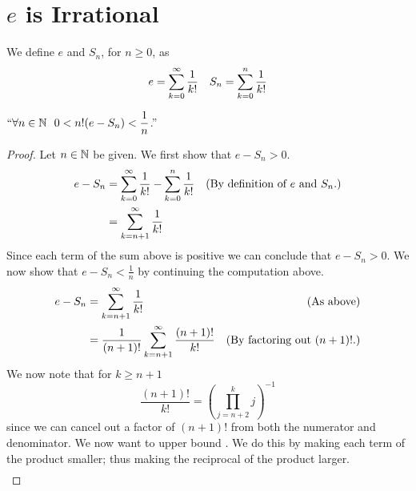     \section{$e$ is Irrational}
        \begin{definition}
            We define $e$ and $S_n$, for $n \ge 0$, as
            \begin{align*}
                e = \displaystyle\sum_{k = 0}^{\infty} \frac{1}{k!}
                & & S_n = \displaystyle\sum_{k = 0}^{n} \frac{1}{k!}
            \end{align*}
        \end{definition}
        \begin{lemma}
            \label{e is Irrational Lemma}
            $``\forall n \in \mathbb{N} \ \ 0 < n! (e - S_n) < \dfrac{1}{n}$.''
        \end{lemma}
        \begin{proof}
            Let $n \in \mathbb{N}$ be given. We first show that $e - S_n > 0$.
            \begin{align*}
                e - S_n &= \sum_{k = 0}^{\infty} \frac{1}{k!} - \sum_{k = 0}^{n} \frac{1}{k!}
                        & (\mbox{By definition of $e$ and $S_n$.}) \\
                        &= \sum_{k = n + 1}^{\infty} \frac{1}{k!} \\
            \end{align*}
            Since each term of the sum above is positive we can conclude that $e - S_n > 0$.
            We now show that $e - S_n < \frac{1}{n}$ by continuing the computation above.
            \begin{align*}
                e - S_n &= \sum_{k = n + 1}^{\infty} \frac{1}{k!} & (\mbox{As above}) \\
                        &= \frac{1}{(n + 1)!} \sum_{k = n + 1}^{\infty} \frac{(n + 1)!}{k!}
                        & (\mbox{By factoring out $(n + 1)!$.}) \\
            \end{align*}
            We now note that for $k \ge n + 1$
            \begin{equation}
                \label{sum term equation}
                \frac{(n + 1)!}{k!} = \left(\prod_{j = n + 2}^{k} j\right)^{-1}
            \end{equation}
            since we can cancel out a factor of $(n + 1)!$ from both the numerator and
            denominator. We now want to upper bound .
            We do this by making each term of the product smaller; thus making the
            reciprocal of the product larger.
            \begin{align*}

\end{align*}
\end{proof}
